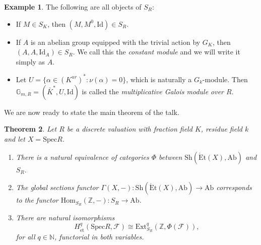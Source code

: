 \documentclass{article}
\newcommand{\Hom}{\mathrm{Hom}}
\newcommand{\Ext}{\mathrm{Ext}}
\newcommand{\Spec}{\mathrm{Spec}}
\newcommand{\Ab}{\mathrm{Ab}}
\newcommand{\Et}{\acute{\mathrm{E}}\mathrm{t}}
\newcommand{\et}{\acute{\mathrm{e}}\mathrm{t}}
\newcommand{\Sh}{\mathrm{Sh}}
\newcommand{\Id}{\mathrm{Id}}
\newcommand{\NN}{\mathbb{N}}
\newcommand{\ZZ}{\mathbb{Z}}
\theoremstyle{plain}
\newtheorem{theorem}{Theorem}[section]
\theoremstyle{definition}
\newtheorem{example}[theorem]{Example}
\begin{document}
    \begin{example}
        The following are all objects of $S_R$:
        \begin{itemize}
            \item If $M\in S_K$, then $(M,M^0,\Id)\in S_R$.
            \item If $A$ is an abelian group equipped with the trivial action by $G_K$, then $(A,A,\Id_A)\in S_R$. We call this the \textit{constant module} and we will write it simply as $A$.
            \item Let $U=\{\alpha\in (K^{ur})^*:\nu(\alpha)=0\}$, which is naturally a $G_k$-module. Then $\mathbb{G}_{m,R}=(\bar K^*,U,\Id)$ is called the \textit{multiplicative Galois module over $R$}.
        \end{itemize}
    \end{example}
    We are now ready to state the main theorem of the talk.
    \begin{theorem}\label{thm:etaleDVR}
        Let $R$ be a discrete valuation with fraction field $K$, residue field $k$ and let $X=\Spec R$.
        \begin{enumerate}
            \item There is a natural equivalence of categories $\Phi$ between $\Sh(\Et(X),\Ab)$ and $S_R$. 
            \item The global sections functor $\Gamma(X,-):\Sh(\Et(X),\Ab)\to\Ab$ corresponds to the functor $\Hom_{S_R}(\ZZ,-):S_R\to\Ab$.
            \item There are natural isomorphisms
            $$H^q_{\et}(\Spec R,\mathcal{F})\cong\Ext_{S_R}^q(\ZZ,\Phi(\mathcal{F})),$$
            for all $q\in\NN$, functorial in both variables.
        \end{enumerate}
    \end{theorem}
\end{document}
